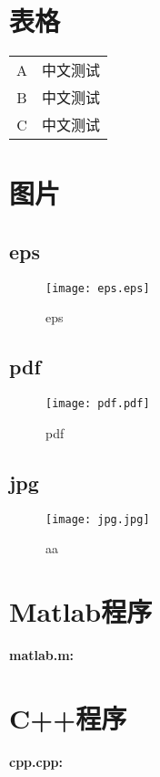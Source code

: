 \documentclass[bwprint]{cumcmthesis}
\begin{document}
\section{表格}

\begin{tabular}{cc}
	\hline
	\makebox[0.4\textwidth][c]{C1}	&  \makebox[0.5\textwidth][c]{C2} \\ \hline
	A	    & 中文测试\\ \hline
	B	    & 中文测试 \\ \hline
	C	    & 中文测试 \\ \hline
\end{tabular}

\section{图片}

\subsection{eps}

\begin{figure}[h]
	\centering
	\texttt{[image: eps.eps]}
	\caption{eps}
\end{figure}
\clearpage
\subsection{pdf}

\begin{figure}[h]
	\centering
	\texttt{[image: pdf.pdf]}
	\caption{pdf}
\end{figure}
\clearpage
\subsection{jpg}

\begin{figure}[h]
	\small
	\centering
	\texttt{[image: jpg.jpg]}
	\caption{aa}
\end{figure}
\clearpage


\nocite{*}


\newpage
\appendix
\section{Matlab程序}

\textcolor[rgb]{0.98,0.00,0.00}{\textbf{matlab.m:}}



\section{C++程序}

\textcolor[rgb]{0.98,0.00,0.00}{\textbf{cpp.cpp:}}


\end{document}
